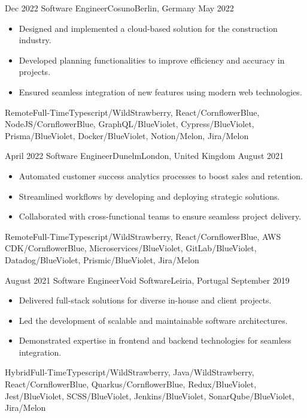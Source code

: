 \begin{experiences}
  \emptySeparator

  \experience
  {Dec 2022} {Software Engineer}{Cosuno}{Berlin, Germany}
  {May 2022}{\begin{itemize}
    \item Designed and implemented a cloud-based solution for the construction industry.
    \item Developed planning functionalities to improve efficiency and accuracy in projects.
    \item Ensured seamless integration of new features using modern web technologies.
  \end{itemize}}
  {Remote}{Full-Time}{Typescript/WildStrawberry, React/CornflowerBlue, NodeJS/CornflowerBlue, GraphQL/BlueViolet, Cypress/BlueViolet, Prisma/BlueViolet, Docker/BlueViolet, Notion/Melon, Jira/Melon}

  \emptySeparator

  \experience
  {April 2022} {Software Engineer}{Dunelm}{London, United Kingdom}
  {August 2021}{\begin{itemize}
    \item Automated customer success analytics processes to boost sales and retention.
    \item Streamlined workflows by developing and deploying strategic solutions.
    \item Collaborated with cross-functional teams to ensure seamless project delivery.
  \end{itemize}}
  {Remote}{Full-Time}{Typescript/WildStrawberry, React/CornflowerBlue, AWS CDK/CornflowerBlue, Microservices/BlueViolet, GitLab/BlueViolet, Datadog/BlueViolet, Prismic/BlueViolet, Jira/Melon}

  \emptySeparator

  \experience
  {August 2021} {Software Engineer}{Void Software}{Leiria, Portugal}
  {September 2019}{\begin{itemize}
    \item Delivered full-stack solutions for diverse in-house and client projects.
    \item Led the development of scalable and maintainable software architectures.
    \item Demonstrated expertise in frontend and backend technologies for seamless integration.
  \end{itemize}}
  {Hybrid}{Full-Time}{Typescript/WildStrawberry, Java/WildStrawberry, React/CornflowerBlue, Quarkus/CornflowerBlue, Redux/BlueViolet, Jest/BlueViolet, SCSS/BlueViolet, Jenkins/BlueViolet, SonarQube/BlueViolet, Jira/Melon}


\end{experiences}
